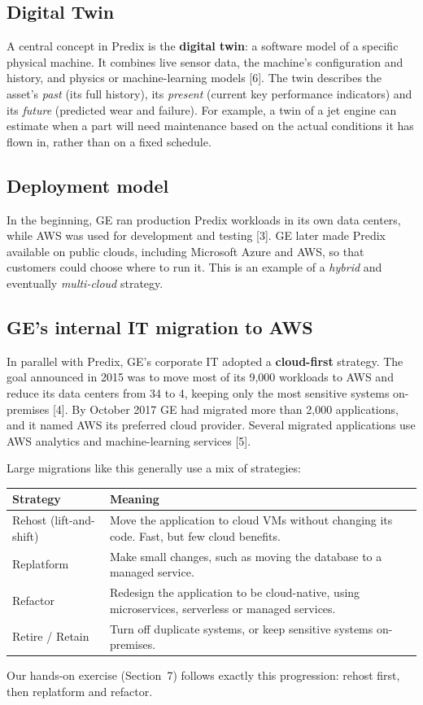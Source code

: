 \documentclass[12pt,a4paper]{article}
\begin{document}
\subsection{Digital Twin}
A central concept in Predix is the \textbf{digital twin}: a software model of a specific physical machine. It
combines live sensor data, the machine's configuration and history, and physics or machine-learning models [6]. The
twin describes the asset's \emph{past} (its full history), its \emph{present} (current key performance indicators) and
its \emph{future} (predicted wear and failure). For example, a twin of a jet engine can estimate when a part will need
maintenance based on the actual conditions it has flown in, rather than on a fixed schedule.

\subsection{Deployment model}
In the beginning, GE ran production Predix workloads in its own data centers, while AWS was used for development and
testing [3]. GE later made Predix available on public clouds, including Microsoft Azure and AWS, so that customers
could choose where to run it. This is an example of a \emph{hybrid} and eventually \emph{multi-cloud} strategy.

\subsection{GE's internal IT migration to AWS}
In parallel with Predix, GE's corporate IT adopted a \textbf{cloud-first} strategy. The goal announced in 2015 was to
move most of its 9,000 workloads to AWS and reduce its data centers from 34 to 4, keeping only the most sensitive
systems on-premises [4]. By October 2017 GE had migrated more than 2,000 applications, and it named AWS its preferred
cloud provider. Several migrated applications use AWS analytics and machine-learning services [5].

Large migrations like this generally use a mix of strategies:
\begin{center}
\begin{tabularx}{\linewidth}{@{}p{3.4cm}L@{}}
\toprule
\textbf{Strategy} & \textbf{Meaning} \\
\midrule
Rehost (lift-and-shift) & Move the application to cloud VMs without changing its code. Fast, but few cloud benefits. \\
Replatform & Make small changes, such as moving the database to a managed service. \\
Refactor & Redesign the application to be cloud-native, using microservices, serverless or managed services. \\
Retire / Retain & Turn off duplicate systems, or keep sensitive systems on-premises. \\
\bottomrule
\end{tabularx}
\end{center}
Our hands-on exercise (Section~7) follows exactly this progression: rehost first, then replatform and refactor.
\end{document}
